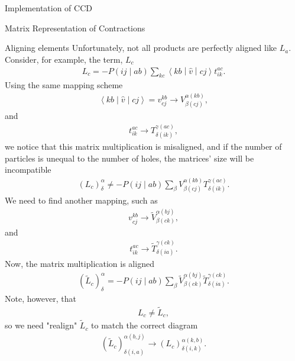 \documentclass[twoside,english]{uiofysmaster}
\begin{document}
\begin{chapter}{Implementation of CCD}
\begin{section}{Matrix Representation of Contractions}
		\begin{subsection}{Aligning elements}	
			Unfortunately, not all products are perfectly aligned like $L_a$. Consider, for example, the term, $L_c$
			\begin{align}
				L_c = -P\left(ij\middle|ab\right) \sum_{kc} \left<kb\middle|\hat v\middle|cj\right>t_{ik}^{ac}.
			\end{align}
			Using the same mapping scheme
			\begin{align}
				\left<kb\middle|\hat v\middle|cj\right> = v_{cj}^{kb} \rightarrow V_{\beta(cj)}^{\alpha(kb)},
			\end{align}
			and
			\begin{align}
				t_{ik}^{ac} \rightarrow T_{\delta(ik)}^{\gamma(ac)},
			\end{align}
			we notice that this matrix multiplication is misaligned, and if the number of particles is unequal to the number of holes, the matrices' size will be incompatible
			\begin{align}
				(L_c)_ \delta^\alpha \neq -P\left(ij\middle|ab\right) \sum_ \beta V_{\beta(cj)}^{\alpha(kb)} T_{\delta(ik)}^{\gamma(ac)}.
			\end{align}
			We need to find another mapping, such as
			\begin{align}
				v_{cj}^{kb} \rightarrow \tilde V_{\beta(ck)}^{\alpha(bj)},
			\end{align}
			and 
			\begin{align}
				t_{ik}^{ac} \rightarrow \tilde T_{\delta(ia)}^{\gamma(ck)}.
			\end{align}
			Now, the matrix multiplication is aligned
			\begin{align}
				(\tilde L_c)_ \delta^\alpha = -P\left(ij\middle|ab\right) \sum_ \beta \tilde V_{\beta(ck)}^{\alpha(bj)} \tilde T_{\delta(ia)}^{\gamma(ck)}.
			\end{align}
			Note, however, that 
			\begin{align}
				L_c \neq \tilde L_c,
			\end{align}
			so we need "realign" $\tilde L_c$ to match the correct diagram
			\begin{align}
				(\tilde L_c)_{\delta(i,a)}^{\alpha(b,j)} \rightarrow (L_c)_{\delta(i,k)}^{\alpha(k,b)}.
			\end{align}


\end{subsection}
\end{section}
\end{chapter}
\end{document}
